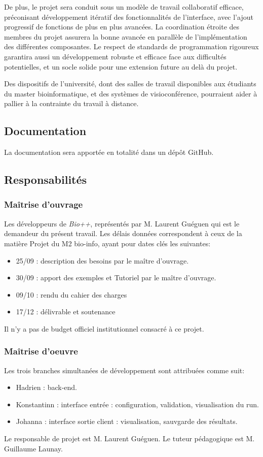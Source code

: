 De plus, le projet sera conduit
sous un modèle de travail collaboratif efficace,
préconisant développement itératif des fonctionnalités de l'interface,
avec l'ajout progressif de fonctions de plus en plus avancées.
La coordination étroite des membres du projet
assurera la bonne avancée en parallèle de l'implémentation des différentes composantes.
Le respect de standards de programmation rigoureux
garantira aussi un développement robuste et efficace face aux difficultés potentielles,
et un socle solide pour une extension future au delà du projet.

Des dispositifs de l'université,
dont des salles de travail disponibles aux étudiants du master bioinformatique,
et des systèmes de visioconférence,
pourraient aider à pallier à la contrainte du travail à distance.

 
\subsection{Documentation} 
La documentation sera apportée en totalité dans un dépôt GitHub.

	
\subsection{Responsabilités}
\subsubsection{Maîtrise d'ouvrage}
Les développeurs de \textit{Bio++}, représentés par M. Laurent Guéguen qui est le
 demandeur du présent travail. Les délais données correspondent à ceux de la matière 
 Projet du M2 bio-info, ayant pour dates clés les suivantes:
\begin{itemize}
	\item 25/09 : description des besoins par le maître d'ouvrage.
	\item 30/09 : apport des exemples et Tutoriel par le maître d'ouvrage.
	\item 09/10 : rendu du cahier des charges 
	\item 17/12 : délivrable et soutenance 
\end{itemize}
Il n'y a pas de budget officiel institutionnel consacré à ce projet. 

\subsubsection{Maîtrise d'oeuvre}

Les trois branches simultanées de développement sont attribuées comme suit:

\begin{itemize}
	\item Hadrien : back-end.
	\item Konstantinn : interface entrée : configuration, validation, visualisation du run.
	\item Johanna : interface sortie client : visualisation, sauvgarde des résultats.
\end{itemize}

Le responsable de projet est M. Laurent Guéguen.
Le tuteur pédagogique est M. Guillaume Launay.

%
